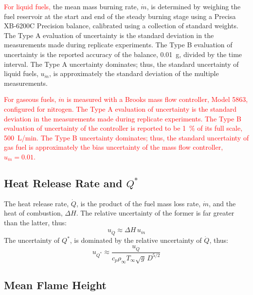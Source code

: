\documentclass[12pt]{article}
\begin{document}
\textcolor{red}{For liquid fuels,} the mean mass burning rate, $\dot{m}$, is determined by weighing the fuel reservoir at the start and end of the steady burning stage using a Precisa XB-6200C Precision balance, calibrated using a collection of standard weights. The Type A evaluation of uncertainty is the standard deviation in the measurements made during replicate experiments. The Type B evaluation of uncertainty is the reported accuracy of the balance, 0.01~g, divided by the time interval. The Type A uncertainty dominates; thus, the standard uncertainty of liquid fuels, $u_{\scriptscriptstyle \dot{m}}$, is approximately the standard deviation of the multiple measurements.

\textcolor{red}{For gaseous fuels, $\dot{m}$ is measured with a Brooks mass flow controller, Model 5863, configured for nitrogen. The Type A evaluation of uncertainty is the standard deviation in the measurements made during replicate experiments. The Type B evaluation of uncertainty of the controller is reported to be 1~\% of its full scale, 500~L/min. The Type B uncertainty dominates; thus, the standard uncertainty of gas fuel is approximately the bias uncertainty of the mass flow controller, $u_{\scriptscriptstyle \dot{m}}=0.01$.}



\subsection{Heat Release Rate and $Q^*$ }
\label{ssec:Heat_Release_Rate}

The heat release rate, $\dot{Q}$, is the product of the fuel mass loss rate, $\dot{m}$, and the heat of combustion, $\Delta H$. The relative uncertainty of the former is far greater than the latter, thus:
\begin{equation}
\label{eq:heat_release_rate_uncertainty}
u_{\scriptscriptstyle \dot{Q}} \approx \Delta H \, u_{\dot{m}}
\end{equation}
The uncertainty of ${Q^*}$, is dominated by the relative uncertainty of $\dot{Q}$, thus:
\begin{equation}
\label{eq:Q*_uncertainty}
u_{\scriptscriptstyle {Q^*}} \approx \frac{u_{\scriptscriptstyle \dot{Q}}}{c_{p}\rho_\infty T_\infty \sqrt{g} \, D^{5/2}}
\end{equation}

\subsection{Mean Flame Height}
\label{ssec:Mean_Flame_Height}
\end{document}
